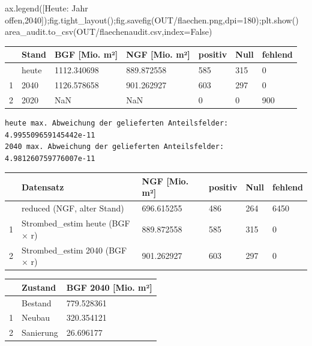 \documentclass[
  ngerman,
  a4paper,
  DIV=11]{scrreprt}
\newenvironment{Shaded}{\begin{snugshade}}{\end{snugshade}}
\newcommand{\DecValTok}[1]{\textcolor[rgb]{0.68,0.00,0.00}{#1}}
\newcommand{\NormalTok}[1]{\textcolor[rgb]{0.00,0.23,0.31}{#1}}
\newcommand{\OperatorTok}[1]{\textcolor[rgb]{0.37,0.37,0.37}{#1}}
\newcommand{\StringTok}[1]{\textcolor[rgb]{0.13,0.47,0.30}{#1}}
\newcommand{\VariableTok}[1]{\textcolor[rgb]{0.07,0.07,0.07}{#1}}
\newcounter{none} %
\begin{document}
\begin{Shaded}
\begin{Highlighting}[]
\NormalTok{ax.legend([}\StringTok{\textquotesingle{}Heute: Jahr offen\textquotesingle{}}\NormalTok{,}\StringTok{\textquotesingle{}2040\textquotesingle{}}\NormalTok{])}\OperatorTok{;}\NormalTok{fig.tight\_layout()}\OperatorTok{;}\NormalTok{fig.savefig(OUT}\OperatorTok{/}\StringTok{\textquotesingle{}flaechen.png\textquotesingle{}}\NormalTok{,dpi}\OperatorTok{=}\DecValTok{180}\NormalTok{)}\OperatorTok{;}\NormalTok{plt.show()}
\NormalTok{area\_audit.to\_csv(OUT}\OperatorTok{/}\StringTok{\textquotesingle{}flaechenaudit.csv\textquotesingle{}}\NormalTok{,index}\OperatorTok{=}\VariableTok{False}\NormalTok{)}
\end{Highlighting}
\end{Shaded}

{\def\LTcaptype{none} %
\begin{longtable}[]{@{}lllllll@{}}
\toprule\noalign{}
& Stand & BGF {[}Mio. m²{]} & NGF {[}Mio. m²{]} & positiv & Null &
fehlend \\
\midrule\noalign{}
\endhead
\bottomrule\noalign{}
\endlastfoot
0 & heute & 1112.340698 & 889.872558 & 585 & 315 & 0 \\
1 & 2040 & 1126.578658 & 901.262927 & 603 & 297 & 0 \\
2 & 2020 & NaN & NaN & 0 & 0 & 900 \\
\end{longtable}
}

\begin{verbatim}
heute max. Abweichung der gelieferten Anteilsfelder: 4.995509659145442e-11
2040 max. Abweichung der gelieferten Anteilsfelder: 4.981260759776007e-11
\end{verbatim}

{\def\LTcaptype{none} %
\begin{longtable}[]{@{}llllll@{}}
\toprule\noalign{}
& Datensatz & NGF {[}Mio. m²{]} & positiv & Null & fehlend \\
\midrule\noalign{}
\endhead
\bottomrule\noalign{}
\endlastfoot
0 & reduced (NGF, alter Stand) & 696.615255 & 486 & 264 & 6450 \\
1 & Strombed\_estim heute (BGF × r) & 889.872558 & 585 & 315 & 0 \\
2 & Strombed\_estim 2040 (BGF × r) & 901.262927 & 603 & 297 & 0 \\
\end{longtable}
}

{\def\LTcaptype{none} %
\begin{longtable}[]{@{}lll@{}}
\toprule\noalign{}
& Zustand & BGF 2040 {[}Mio. m²{]} \\
\midrule\noalign{}
\endhead
\bottomrule\noalign{}
\endlastfoot
0 & Bestand & 779.528361 \\
1 & Neubau & 320.354121 \\
2 & Sanierung & 26.696177 \\
\end{longtable}
}
\end{document}
